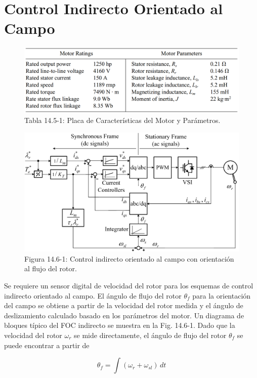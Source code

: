 \documentclass[letterpaper,12pt]{article}
\begin{document}
\section{Control Indirecto Orientado al Campo}

\begin{figure}[ht]
\centering
\caption{Tabla 14.5-1: Placa de Características del Motor y Parámetros.}
\includegraphics[scale=0.4]{graficos/tabla_14_5_1.png}
\end{figure}
\FloatBarrier

\begin{figure}[ht]
\centering
\includegraphics{graficos/img19.jpg}
\caption{Figura 14.6-1: Control indirecto orientado al campo con orientación al flujo del rotor.}
\end{figure}
\FloatBarrier

\clearpage
Se requiere un sensor digital de velocidad del rotor para los esquemas de control indirecto orientado al campo. El ángulo de flujo del rotor $\theta_f$ para la orientación del campo se obtiene a partir de la velocidad del rotor medida y el ángulo de deslizamiento calculado basado en los parámetros del motor. Un diagrama de bloques típico del FOC indirecto se muestra en la Fig. 14.6-1. Dado que la velocidad del rotor $\omega_r$ se mide directamente, el ángulo de flujo del rotor $\theta_f$ se puede encontrar a partir de

\begin{equation}
\theta_f = \int (\omega_r + \omega_{sl}) \, dt \tag{14.6-1}
\end{equation}
\end{document}
